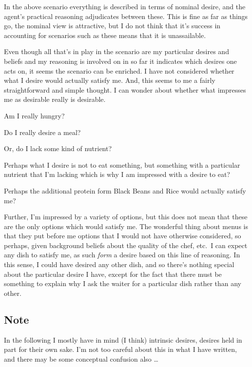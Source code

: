 \documentclass[10pt]{article}
\begin{document}
In the above scenario everything is described in terms of nominal desire, and the agent's practical reasoning adjudicates between these.
This is fine as far as things go, the nominal view is attractive, but I do not think that it's success in accounting for scenarios such as these means that it is unassailable.

Even though all that's in play in the scenario are my particular desires and beliefs and my reasoning is involved on in so far it indicates which desires one acts on, it seems the scenario can be enriched.
I have not considered whether what I desire would actually satisfy me.
And, this seems to me a fairly straightforward and simple thought.
I can wonder about whether what impresses me as desirable really is desirable.
\begin{enumerate*}[label=\arabic*.]
\item Am I really hungry?
\item Do I really desire a meal?
\item Or, do I lack some kind of nutrient?
\item Perhaps what I desire is not to eat something, but something with a particular nutrient that I'm lacking which is why I am impressed with a desire to eat?
\item Perhaps the additional protein form Black Beans and Rice would actually satisfy me?
\end{enumerate*}

Further, I'm impressed by a variety of options, but this does not mean that these are the only options which would satisfy me.
The wonderful thing about menus is that they put before me options that I would not have otherwise considered, so perhaps, given background beliefs about the quality of the chef, etc.\ I can expect any dish to satisfy me, as such \emph{form} a desire based on this line of reasoning.
In this sense, I could have desired any other dish, and so there's nothing special about the particular desire I have, except for the fact that there must be something to explain why I ask the waiter for a particular dish rather than any other.

\subsection{Note}
\label{sec:note}

In the following I mostly have in mind (I think) intrinsic desires, desires held in part for their own sake.
I'm not too careful about this in what I have written, and there may be some conceptual confusion also \dots
\end{document}
